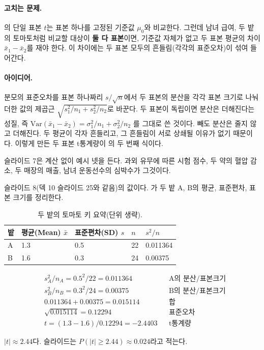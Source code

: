 \paragraph{고치는 문제.} 의 단일 표본 $t$는 표본
하나를 고정된 기준값 $\mu_0$와 비교한다. 그런데 남녀 급여, 두 밭의
토마토처럼 비교할 대상이 \textbf{둘 다 표본}이면, 기준값 자체가 없고
두 표본 평균의 차이 $\bar x_1 - \bar x_2$를 재야 한다. 이 차이에는
두 표본 모두의 흔들림(각각의 표준오차)이 섞여 들어간다.

\paragraph{아이디어.} 분모의 표준오차를 표본 하나짜리 $s/\sqrt n$에서
두 표본의 분산을 각각 표본 크기로 나눠 더한 값의 제곱근
$\sqrt{s_1^2/n_1 + s_2^2/n_2}$로 바꾼다. 두 표본이 독립이면 분산은
더해진다는 성질, 즉 $\mathrm{Var}(\bar x_1 - \bar x_2) = \sigma_1^2/n_1 + \sigma_2^2/n_2$
를 그대로 쓴 것이다. 빼도 분산은 줄지 않고 더해진다. 두 평균이 각자 흔들리고, 그 흔들림이 서로 상쇄될 이유가 없기 때문이다. 이렇게 만든
두 표본 t통계량이 의 두 번째 식이다.

슬라이드 7은 계산 없이 예시 넷을 든다. 과외 유무에 따른 시험 점수,
두 약의 혈압 감소, 두 매장의 매출, 남녀 운동선수의 심박수가 그것이다.

\begin{example}[두 밭의 토마토]
\label{ex:cd-tomato}
슬라이드 8(덱 10 슬라이드 25와 같음)의 값이다. 가
두 밭 A, B의 평균, 표준편차, 표본 크기를 정리한다.

\begin{table}[H]\centering
\begin{tabularx}{\linewidth}{@{}l X X X X@{}}
\toprule
밭 & 평균(Mean) $\bar x$ & 표준편차(SD) $s$ & $n$ & $s^2/n$ \\
\midrule
A & 1.3 & 0.5 & 22 & 0.011364 \\
\midrule
B & 1.6 & 0.3 & 24 & 0.00375 \\
\bottomrule
\end{tabularx}
\caption{두 밭의 토마토 키 요약(단위 생략).}
\label{tab:cd-tomato}
\end{table}

\begin{align*}
  &s_A^2/n_A = 0.5^2/22 = 0.011364 && \text{A의 분산/표본크기}\\
  &s_B^2/n_B = 0.3^2/24 = 0.00375 && \text{B의 분산/표본크기}\\
  &0.011364 + 0.00375 = 0.015114 && \text{합}\\
  &\sqrt{0.015114} = 0.12294 && \text{표준오차}\\
  &t = (1.3 - 1.6)/0.12294 = -2.4403 && \text{t통계량}
\end{align*}

$|t| \approx 2.44$다. 슬라이드는 $P(|t| \ge 2.44) \approx 0.024$라고
적는다.
\end{example}

